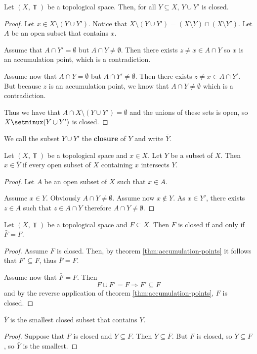 \documentclass[../../main/main.tex]{subfiles}
\begin{document}
\begin{remark}
  Let $(X, \Top)$ be a topological space. Then, for all $Y \subseteq X$, $Y \cup Y'$ is closed.
\end{remark}
\begin{proof}
  Let $x \in X \setminus (Y \cup Y')$. Notice that $X \setminus (Y \cup Y') = (X \setminus Y) \cap (X \setminus Y')$. Let $A$ be an open subset that contains $x$.

  Assume that $A \cap Y' = \emptyset$ but $A \cap Y \neq \emptyset$. Then there exists $z \neq x \in A \cap Y$ so $x$ is an accumulation point, which is a contradiction.

  Assume now that $A \cap Y = \emptyset$ but $A \cap Y' \neq \emptyset$. Then there exists $z \neq x \in A \cap Y'$. But because $z$ is an accumulation point, we know that $A \cap Y \neq \emptyset$ which is a contradiction.

  Thus we have that $A \cap X \setminus (Y \cup Y') = \emptyset$ and the unions of these sets is open, so $X \setminux (Y \cup Y')$ is closed.
\end{proof}

\begin{definition}
  We call the subset $Y \cup Y'$ the {\bf closure} of $Y$ and write $\bar{Y}$.
\end{definition}

\begin{remark}
  Let $(X, \Top)$ be a topological space and $x \in X$. Let $Y$ be a subset of $X$. Then $x \in \bar{Y}$ if every open subset of $X$ containing $x$ intersects $Y$.
\end{remark}
\begin{proof}
  Let $A$ be an open subset of $X$ such that $x \in A$.

  Assume $x \in Y$. Obviously $A \cap Y \neq \emptyset$. Assume now $x \notin Y$. As $x \in Y'$, there exists $z \in A$ such that $z \in A \cap Y$ therefore $A \cap Y \neq \emptyset$.
\end{proof}

\begin{corolary}
  Let $(X, \Top)$ be a topological space and $F \subseteq X$. Then $F$ is closed if and only if $\bar{F} = F$.
\end{corolary}
\begin{proof}
  Assume $F$ is closed. Then, by theorem \ref{thm:accumulation-points} it follows that $F' \subseteq F$, thus $\bar{F} = F$.

  Assume now that $\bar{F} = F$. Then
    \begin{equation*}
      F \cup F' = F \Longrightarrow F' \subseteq F
    \end{equation*}
    and by the reverse application of theorem \ref{thm:accumulation-points}, $F$ is closed.
\end{proof}

\begin{corolary}
  $\bar{Y}$ is the smallest closed subset that contains $Y$.
\end{corolary}
\begin{proof}
  Suppose that $F$ is closed and $Y \subseteq F$. Then $\bar{Y} \subseteq \bar{F}$. But $F$ is closed, so $\bar{Y} \subseteq F$, so $\bar{Y}$ is the smallest.
\end{proof}
\end{document}
